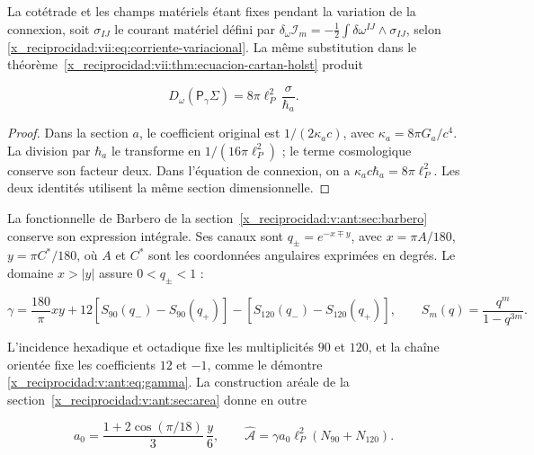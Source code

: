 La cotétrade et les champs matériels étant fixes pendant la variation de la connexion, soit \(\sigma_{IJ}\) le courant matériel défini par
\(\delta_\omega\mathcal I_m=-\tfrac12\int\delta\omega^{IJ}\wedge\sigma_{IJ}\), selon \eqref{x_reciprocidad:vii:eq:corriente-variacional}. La même substitution dans le théorème~\ref{x_reciprocidad:vii:thm:ecuacion-cartan-holst} produit



\begin{equation}
D_\omega(\mathsf P_\gamma\Sigma)
=8\pi\ell_P^2\,\frac{\sigma}{\hbar_a}.
\label{x_reciprocidad:nuc12:eq:4.3}
\end{equation}



\begin{proof}
Dans la section \(a\), le coefficient original est \(1/(2\kappa_a c)\), avec \(\kappa_a=8\pi G_a/c^4\). La division par \(\hbar_a\) le transforme en \(1/(16\pi\ell_P^2)\) ; le terme cosmologique conserve son facteur deux. Dans l’équation de connexion, on a \(\kappa_a c\hbar_a=8\pi\ell_P^2\). Les deux identités utilisent la même section dimensionnelle.
\end{proof}

La fonctionnelle de Barbero de la section~\ref{x_reciprocidad:v:ant:sec:barbero} conserve son expression intégrale. Ses canaux sont \(q_\pm=e^{-x\mp y}\), avec \(x=\pi A/180\), \(y=\pi C^*/180\), où \(A\) et \(C^*\) sont les coordonnées angulaires exprimées en degrés. Le domaine \(x>|y|\) assure \(0<q_\pm<1\) :



\begin{equation}
\gamma=\frac{180}{\pi}xy+
12[S_{90}(q_-)-S_{90}(q_+)]
-[S_{120}(q_-)-S_{120}(q_+)],\qquad
S_m(q)=\frac{q^m}{1-q^{3m}}.
\label{x_reciprocidad:nuc12:eq:4.4}
\end{equation}



L’incidence hexadique et octadique fixe les multiplicités \(90\) et \(120\), et la chaîne orientée fixe les coefficients \(12\) et \(-1\), comme le démontre \eqref{x_reciprocidad:v:ant:eq:gamma}. La construction aréale de la section~\ref{x_reciprocidad:v:ant:sec:area} donne en outre



\begin{equation}
a_0=\frac{1+2\cos(\pi/18)}3\,\frac y6,\qquad
\widehat{\mathcal A}=\gamma a_0\ell_P^2(N_{90}+N_{120}).
\label{x_reciprocidad:nuc12:eq:4.5}
\end{equation}



